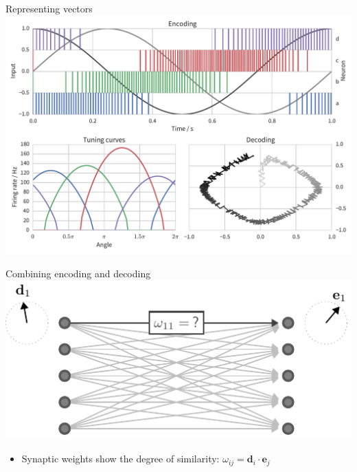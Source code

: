 \documentclass[handout,t]{beamer}
\renewcommand{\vec}{\mathbf}
\begin{document}
  \begin{frame}[plain]{Representing vectors}
    \vfill
    \includegraphics[width=\textwidth]{encoding_decoding2d}
    \vfill
  \end{frame}

  \begin{frame}{Combining encoding and decoding}
    \includegraphics[width=\textwidth]{weight_matrices}

    \begin{itemize}
      \item Synaptic weights show the degree of similarity: $\omega_{ij} = \vec{d}_i \cdot \vec{e}_j$
    \end{itemize}
  \end{frame}
\end{document}

